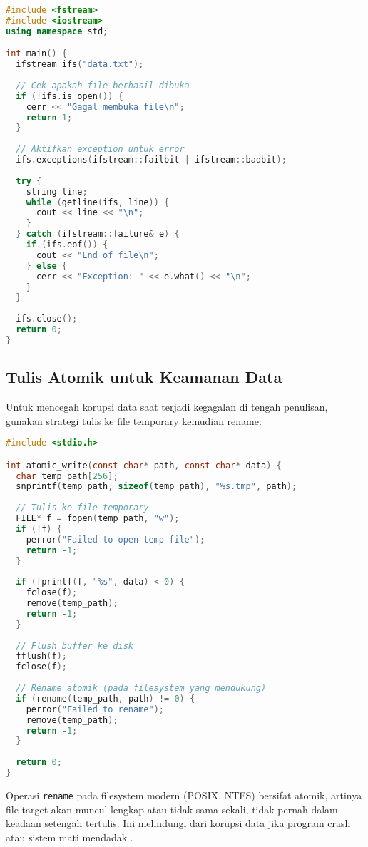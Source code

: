 \documentclass[../main.tex]{subfiles}
\begin{document}
\begin{lstlisting}[language=C++, caption={Penanganan kesalahan di C++}]
#include <fstream>
#include <iostream>
using namespace std;

int main() {
  ifstream ifs("data.txt");
  
  // Cek apakah file berhasil dibuka
  if (!ifs.is_open()) {
    cerr << "Gagal membuka file\n";
    return 1;
  }
  
  // Aktifkan exception untuk error
  ifs.exceptions(ifstream::failbit | ifstream::badbit);
  
  try {
    string line;
    while (getline(ifs, line)) {
      cout << line << "\n";
    }
  } catch (ifstream::failure& e) {
    if (ifs.eof()) {
      cout << "End of file\n";
    } else {
      cerr << "Exception: " << e.what() << "\n";
    }
  }
  
  ifs.close();
  return 0;
}
\end{lstlisting}

\subsection{Tulis Atomik untuk Keamanan Data}

Untuk mencegah korupsi data saat terjadi kegagalan di tengah penulisan, gunakan strategi tulis ke file temporary kemudian rename:

\begin{lstlisting}[language=C, caption={Menulis ke file sementara lalu rename (C, POSIX)}]
#include <stdio.h>

int atomic_write(const char* path, const char* data) {
  char temp_path[256];
  snprintf(temp_path, sizeof(temp_path), "%s.tmp", path);
  
  // Tulis ke file temporary
  FILE* f = fopen(temp_path, "w");
  if (!f) {
    perror("Failed to open temp file");
    return -1;
  }
  
  if (fprintf(f, "%s", data) < 0) {
    fclose(f);
    remove(temp_path);
    return -1;
  }
  
  // Flush buffer ke disk
  fflush(f);
  fclose(f);
  
  // Rename atomik (pada filesystem yang mendukung)
  if (rename(temp_path, path) != 0) {
    perror("Failed to rename");
    remove(temp_path);
    return -1;
  }
  
  return 0;
}
\end{lstlisting}

Operasi \texttt{rename} pada filesystem modern (POSIX, NTFS) bersifat atomik, artinya file target akan muncul lengkap atau tidak sama sekali, tidak pernah dalam keadaan setengah tertulis. Ini melindungi dari korupsi data jika program crash atau sistem mati mendadak \parencite{gnu-c-manual}.
\end{document}
